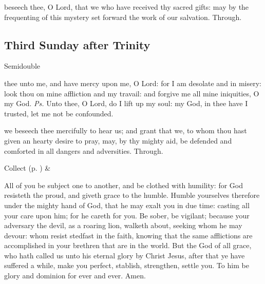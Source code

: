 \vspace{-0.25\baselineskip}

\postcommunion

\vspace{-0.05\baselineskip}

 beseech thee, O Lord, that we who have received thy sacred gifts: may by the frequenting of this mystery set forward the work of our salvation. Through.


\clearpage
\subsection{Third Sunday after Trinity}\label{TrinityIII}
\begin{inhead}
    {Semidouble}
\end{inhead}


\introit
{} thee unto me, and have mercy upon me, O Lord: for I am desolate and in misery: look thou on mine affliction and my travail: and forgive me all mine iniquities, O my God. \textit{Ps.} Unto thee, O Lord, do I lift up my soul: my God, in thee have I trusted, let me not be confounded.

\collect\label{TrinityIIICollect}
 we beseech thee mercifully to hear us; and grant that we, to whom thou hast given an hearty desire to pray, may, by thy mighty aid, be defended and comforted in all dangers and adversities. Through.
\begin{rubric}
     Collect  (p. \pageref{SPSaints}) \&  
\end{rubric}

 All of you be subject one to another, and be clothed with humility: for God resisteth the proud, and giveth grace to the humble. Humble yourselves therefore under the mighty hand of God, that he may exalt you in due time: casting all your care upon him; for he careth for you. Be sober, be vigilant; because your adversary the devil, as a roaring lion, walketh about, seeking whom he may devour: whom resist stedfast in the faith, knowing that the same afflictions are accomplished in your brethren that are in the world. But the God of all grace, who hath called us unto his eternal glory by Christ Jesus, after that ye have suffered a while, make you perfect, stablish, strengthen, settle you. To him be glory and dominion for ever and ever. Amen.

